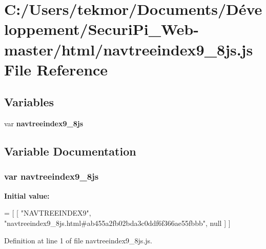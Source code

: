 \section{C\+:/\+Users/tekmor/\+Documents/\+Développement/\+Securi\+Pi\+\_\+\+Web-\/master/html/navtreeindex9\+\_\+8js.js File Reference}
\label{navtreeindex9__8js_8js}
\subsection*{Variables}
\begin{DoxyCompactItemize}
\item 
var {\bf navtreeindex9\+\_\+8js}
\end{DoxyCompactItemize}


\subsection{Variable Documentation}
\subsubsection[{navtreeindex9\+\_\+8js}]{\setlength{\rightskip}{0pt plus 5cm}var navtreeindex9\+\_\+8js}\label{navtreeindex9__8js_8js_a6db3eb4ab77ea1559e95233b8610c27f}
{\bfseries Initial value\+:}
\begin{DoxyCode}
=
[
    [ \textcolor{stringliteral}{"NAVTREEINDEX9"}, \textcolor{stringliteral}{"navtreeindex9\_8js.html#ab455a2fb02bda3c0ddf6f366ae55fbbb"}, null ]
]
\end{DoxyCode}


Definition at line 1 of file navtreeindex9\+\_\+8js.\+js.

